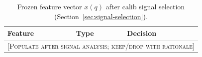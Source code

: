 \begin{table}[t]
  \centering
  \small
  \begin{tabular}{@{}lll@{}}
    \toprule
    \textbf{Feature} & \textbf{Type} & \textbf{Decision} \\
    \midrule
    \multicolumn{3}{l}{\textsc{[Populate after signal analysis; keep/drop with rationale]}} \\
    \bottomrule
  \end{tabular}
  \caption{Frozen feature vector $x(q)$ after calib signal selection (Section~\ref{sec:signal-selection}).}
  \label{tab:feature-selection}
\end{table}
